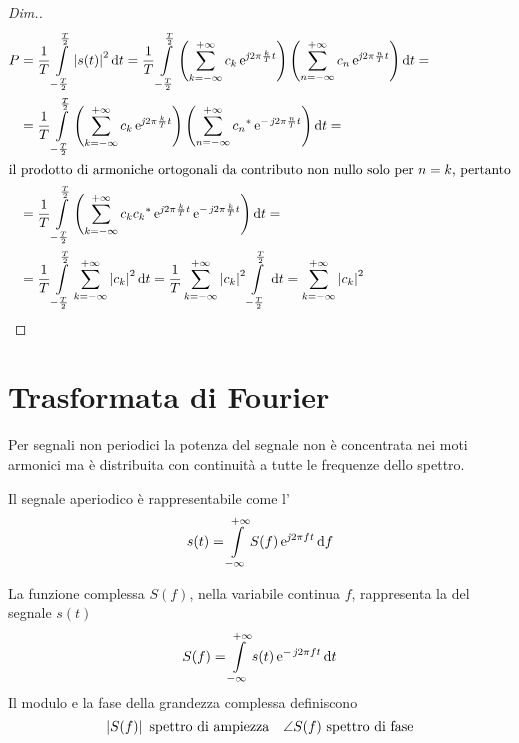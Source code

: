 \begin{proof}[Dim.]
\begin{align*}
P&=\frac{1}{T}\intd{-\frac{T}{2}}{\frac{T}{2}}{\abs{s(t)}^2}{t}=\frac{1}{T}\intd{-\frac{T}{2}}{\frac{T}{2}}{ \left(\sum_{k=-\infty}^{+\infty}{c_k\e{\imath 2\pi\frac{k}{T}t}}\right) \left(\sum_{n=-\infty}^{+\infty}{c_n\e{\imath 2\pi\frac{n}{T}t}}\right)}{t}= \\
&=\frac{1}{T}\intd{-\frac{T}{2}}{\frac{T}{2}}{ \left(\sum_{k=-\infty}^{+\infty}{c_k\e{\imath 2\pi\frac{k}{T}t}}\right) \left(\sum_{n=-\infty}^{+\infty}{\conj{c_n}\e{-\imath 2\pi\frac{n}{T}t}}\right)}{t}= \\
\intertext{il prodotto di armoniche ortogonali da contributo non nullo solo per $n=k$, pertanto}
&=\frac{1}{T}\intd{-\frac{T}{2}}{\frac{T}{2}}{ \left(\sum_{k=-\infty}^{+\infty}{c_k \conj{c_k} \e{\imath 2\pi\frac{k}{T}t} \e{-\imath 2\pi\frac{k}{T}t}}\right)}{t}= \\
&=\frac{1}{T}\intd{-\frac{T}{2}}{\frac{T}{2}}{\sum_{k=-\infty}^{+\infty}{\abs{c_k}^2}}{t}=
\frac{1}{T}\sum_{k=-\infty}^{+\infty}{\abs{c_k}^2}\intd{-\frac{T}{2}}{\frac{T}{2}}{}{t}=\sum_{k=-\infty}^{+\infty}{\abs{c_k}^2}
\qedhere
\end{align*}
\end{proof}

\section{Trasformata di Fourier}
Per segnali non periodici la potenza del segnale non è concentrata nei moti armonici ma è distribuita con continuità a tutte le frequenze dello spettro.

Il segnale aperiodico è rappresentabile come l'
\begin{equation}\label{eq:antitrasformata_Fourier}
s(t)=\int\limits_{-\infty}^{+\infty}{S(f)\operatorname{e}^{\operatorname{\mathit{j}\!} 2\pi f t}}{\,\mathop{}\!\mathrm{d}{f}}
\end{equation}

La funzione complessa $S(f)$, nella variabile continua $f$, rappresenta la  del segnale $s(t)$
\begin{equation}\label{eq:trasformata_Fourier}
S(f)=\int\limits_{-\infty}^{+\infty}{s(t)\operatorname{e}^{-\operatorname{\mathit{j}\!} 2\pi f t}}{\,\mathop{}\!\mathrm{d}{t}}
\end{equation}
Il modulo e la fase della grandezza complessa definiscono
\[\left|{S(f)}\right| \text{ spettro di ampiezza} \quad \angle S(f) \text{ spettro di fase}\]

